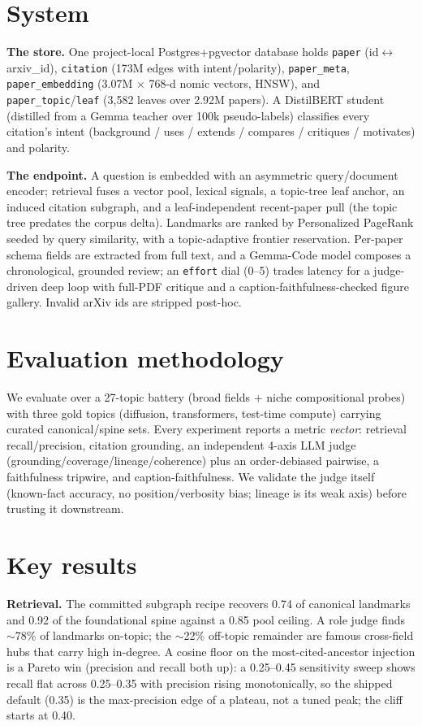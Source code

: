 \documentclass[11pt]{article}
\begin{document}
\section{System}
\textbf{The store.} One project-local Postgres+pgvector database holds \texttt{paper} (id$\leftrightarrow$
arxiv\_id), \texttt{citation} (173M edges with intent/polarity), \texttt{paper\_meta}, \texttt{paper\_embedding}
(3.07M $\times$ 768-d nomic vectors, HNSW), and \texttt{paper\_topic}/\texttt{leaf} (3{,}582 leaves over
2.92M papers). A DistilBERT student (distilled from a Gemma teacher over 100k pseudo-labels) classifies
every citation's intent (background / uses / extends / compares / critiques / motivates) and polarity.

\textbf{The endpoint.} A question is embedded with an asymmetric query/document encoder; retrieval fuses
a vector pool, lexical signals, a topic-tree leaf anchor, an induced citation subgraph, and a
leaf-independent recent-paper pull (the topic tree predates the corpus delta). Landmarks are ranked by
Personalized PageRank seeded by query similarity, with a topic-adaptive frontier reservation. Per-paper
schema fields are extracted from full text, and a Gemma-Code model composes a chronological, grounded
review; an \texttt{effort} dial (0--5) trades latency for a judge-driven deep loop with full-PDF critique
and a caption-faithfulness-checked figure gallery. Invalid arXiv ids are stripped post-hoc.

\section{Evaluation methodology}
We evaluate over a 27-topic battery (broad fields + niche compositional probes) with three gold topics
(diffusion, transformers, test-time compute) carrying curated canonical/spine sets. Every experiment
reports a metric \emph{vector}: retrieval recall/precision, citation grounding, an independent 4-axis
LLM judge (grounding/coverage/lineage/coherence) plus an order-debiased pairwise, a faithfulness
tripwire, and caption-faithfulness. We validate the judge itself (known-fact accuracy, no
position/verbosity bias; lineage is its weak axis) before trusting it downstream.

\section{Key results}
\textbf{Retrieval.} The committed subgraph recipe recovers 0.74 of canonical landmarks and 0.92 of the
foundational spine against a 0.85 pool ceiling. A role judge finds $\sim$78\% of landmarks on-topic; the
$\sim$22\% off-topic remainder are famous cross-field hubs that carry high in-degree. A cosine floor on
the most-cited-ancestor injection is a Pareto win (precision and recall both up): a 0.25--0.45
sensitivity sweep shows recall flat across 0.25--0.35 with precision rising monotonically, so the
shipped default (0.35) is the max-precision edge of a plateau, not a tuned peak; the cliff starts at
0.40.
\end{document}
